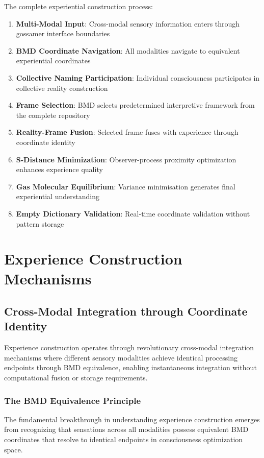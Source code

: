 \documentclass{article}
\begin{document}
The complete experiential construction process:
\begin{enumerate}
\item \textbf{Multi-Modal Input}: Cross-modal sensory information enters through gossamer interface boundaries
\item \textbf{BMD Coordinate Navigation}: All modalities navigate to equivalent experiential coordinates
\item \textbf{Collective Naming Participation}: Individual consciousness participates in collective reality construction 
\item \textbf{Frame Selection}: BMD selects predetermined interpretive framework from the complete repository
\item \textbf{Reality-Frame Fusion}: Selected frame fuses with experience through coordinate identity
\item \textbf{S-Distance Minimization}: Observer-process proximity optimization enhances experience quality
\item \textbf{Gas Molecular Equilibrium}: Variance minimisation generates final experiential understanding
\item \textbf{Empty Dictionary Validation}: Real-time coordinate validation without pattern storage
\end{enumerate}

\section{Experience Construction Mechanisms}

\subsection{Cross-Modal Integration through Coordinate Identity}

Experience construction operates through revolutionary cross-modal integration mechanisms where different sensory modalities achieve identical processing endpoints through BMD equivalence, enabling instantaneous integration without computational fusion or storage requirements.

\subsubsection{The BMD Equivalence Principle}

The fundamental breakthrough in understanding experience construction emerges from recognizing that sensations across all modalities possess equivalent BMD coordinates that resolve to identical endpoints in consciousness optimization space.
\end{document}
